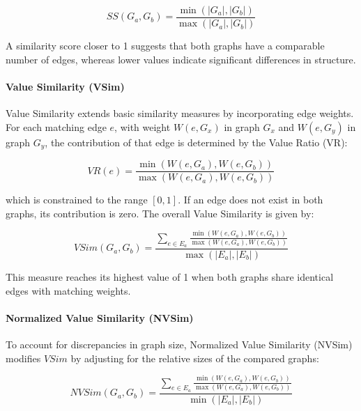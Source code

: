 \documentclass{article}
\begin{document}
\[
SS(G_a, G_b) = \frac{\min(|G_a|, |G_b|)}{\max(|G_a|, |G_b|)}
\]

A similarity score closer to 1 suggests that both graphs have a comparable number of edges, whereas lower values indicate significant differences in structure.

\paragraph{Value Similarity (VSim)}

Value Similarity extends basic similarity measures by incorporating edge weights. For each matching edge \( e \), with weight \( W(e, G_x) \) in graph \( G_x \) and \( W(e, G_y) \) in graph \( G_y \), the contribution of that edge is determined by the Value Ratio (VR):

\[
VR(e) = \frac{\min(W(e, G_{a}), W(e, G_{b}))}{\max(W(e, G_{a}), W(e, G_{b}))}
\]

which is constrained to the range \([0,1]\). If an edge does not exist in both graphs, its contribution is zero. The overall Value Similarity is given by:

\[
VSim(G_{a}, G_{b}) = 
\frac{\sum_{e \in E_{a}} \frac{\min(W(e, G_{a}), W(e, G_{b}))}{\max(W(e, G_{a}), W(e, G_{b}))}}{\max(|E_{a}|, |E_{b}|)}
\]

This measure reaches its highest value of 1 when both graphs share identical edges with matching weights.

\paragraph{Normalized Value Similarity (NVSim)}

To account for discrepancies in graph size, Normalized Value Similarity (NVSim) modifies \( VSim \) by adjusting for the relative sizes of the compared graphs:

\[
NVSim(G_{a}, G_{b}) = 
\frac{\sum_{e \in E_{a}} \frac{\min(W(e, G_{a}), W(e, G_{b}))}{\max(W(e, G_{a}), W(e, G_{b}))}}{\min(|E_{a}|, |E_{b}|)}
\]
\end{document}

